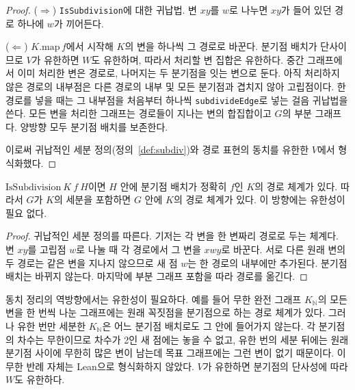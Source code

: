 \begin{proof}
\leanok
(\(\Rightarrow\)) \texttt{IsSubdivision}에 대한 귀납법. 변 \(xy\)를 \(w\)로 나누면 \(xy\)가 들어 있던 경로
하나에 \(w\)가 끼어든다.

(\(\Leftarrow\)) \(K.\mathrm{map}\,f\)에서 시작해 \(K\)의 변을 하나씩 그 경로로 바꾼다. 분기점 배치가
단사이므로 \(V\)가 유한하면 \(W\)도 유한하며, 따라서 처리할 변 집합은 유한하다. 중간 그래프에서 이미
처리한 변은 경로로, 나머지는 두 분기점을 잇는 변으로 둔다. 아직 처리하지 않은 경로의 내부점은 다른
경로의 내부 및 모든 분기점과 겹치지 않아 고립점이다. 한 경로를 넣을 때는 그 내부점을 처음부터 하나씩
\texttt{subdivideEdge}로 넣는 걸음 귀납법을 쓴다. 모든 변을 처리한 그래프는 경로들이 지나는 변의 합집합이고
\(G\)의 부분 그래프다. 양방향 모두 분기점 배치를 보존한다.

이로써 귀납적인 세분 정의(정의~\ref{def:subdiv})와 경로 표현의 동치를 유한한 \(V\)에서 형식화했다.
\end{proof}

\begin{lemma}
\label{lem:subdivision_paths_forward}
\leanok
\(\mathrm{IsSubdivision}\ K\ f\ H\)이면 \(H\) 안에 분기점 배치가 정확히 \(f\)인 \(K\)의 경로 체계가 있다.
따라서 \(G\)가 \(K\)의 세분을 포함하면 \(G\) 안에 \(K\)의 경로 체계가 있다. 이 방향에는 유한성이 필요 없다.
\end{lemma}

\begin{proof}
\leanok
귀납적인 세분 정의를 따른다. 기저는 각 변을 한 변짜리 경로로 두는 체계다. 변 \(xy\)를 고립점 \(w\)로
나눌 때 각 경로에서 그 변을 \(xwy\)로 바꾼다. 서로 다른 원래 변의 두 경로는 같은 변을 지나지 않으므로
새 점 \(w\)는 한 경로의 내부에만 추가된다. 분기점 배치는 바뀌지 않는다. 마지막에 부분 그래프 포함을 따라
경로를 옮긴다.
\end{proof}

동치 정리의 역방향에서는 유한성이 필요하다. 예를 들어 무한 완전 그래프 \(K_{\mathbb{N}}\)의 모든 변을
한 번씩 나눈 그래프에는 원래 꼭짓점을 분기점으로 하는 경로 체계가 있다. 그러나 유한 번만 세분한
\(K_{\mathbb{N}}\)은 어느 분기점 배치로도 그 안에 들어가지 않는다. 각 분기점의 차수는 무한이므로
차수가 2인 새 점에는 놓을 수 없고, 유한 번의 세분 뒤에는 원래 분기점 사이에 무한히 많은 변이 남는데
목표 그래프에는 그런 변이 없기 때문이다. 이 무한 반례 자체는 Lean으로 형식화하지 않았다.
\(V\)가 유한하면 분기점의 단사성에 따라 \(W\)도 유한하다.

